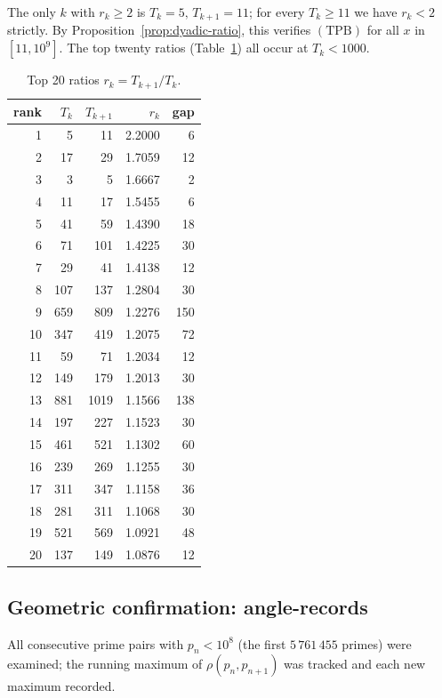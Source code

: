 \documentclass[11pt]{article}
\begin{document}
The only $k$ with $r_k\ge 2$ is $T_k=5,\,T_{k+1}=11$; for every
$T_k\ge 11$ we have $r_k<2$ strictly. By
Proposition~\ref{prop:dyadic-ratio}, this verifies $(\mathrm{TPB})$
for all $x$ in $[11,10^9]$. The top twenty ratios
(Table~\ref{tab:top20}) all occur at $T_k<1000$.

\begin{table}[h]
\centering
\caption{Top 20 ratios $r_k=T_{k+1}/T_k$.}\label{tab:top20}
\begin{tabular}{rrrrr}
\toprule
rank & $T_k$ & $T_{k+1}$ & $r_k$ & gap \\
\midrule
1 & 5 & 11 & 2.2000 & 6 \\
2 & 17 & 29 & 1.7059 & 12 \\
3 & 3 & 5 & 1.6667 & 2 \\
4 & 11 & 17 & 1.5455 & 6 \\
5 & 41 & 59 & 1.4390 & 18 \\
6 & 71 & 101 & 1.4225 & 30 \\
7 & 29 & 41 & 1.4138 & 12 \\
8 & 107 & 137 & 1.2804 & 30 \\
9 & 659 & 809 & 1.2276 & 150 \\
10 & 347 & 419 & 1.2075 & 72 \\
11 & 59 & 71 & 1.2034 & 12 \\
12 & 149 & 179 & 1.2013 & 30 \\
13 & 881 & 1019 & 1.1566 & 138 \\
14 & 197 & 227 & 1.1523 & 30 \\
15 & 461 & 521 & 1.1302 & 60 \\
16 & 239 & 269 & 1.1255 & 30 \\
17 & 311 & 347 & 1.1158 & 36 \\
18 & 281 & 311 & 1.1068 & 30 \\
19 & 521 & 569 & 1.0921 & 48 \\
20 & 137 & 149 & 1.0876 & 12 \\
\bottomrule
\end{tabular}
\end{table}

\subsection{Geometric confirmation: angle-records}

All consecutive prime pairs with $p_n<10^8$ (the first $5\,761\,455$
primes) were examined; the running maximum of $\rho(p_n,p_{n+1})$ was
tracked and each new maximum recorded.
\end{document}
